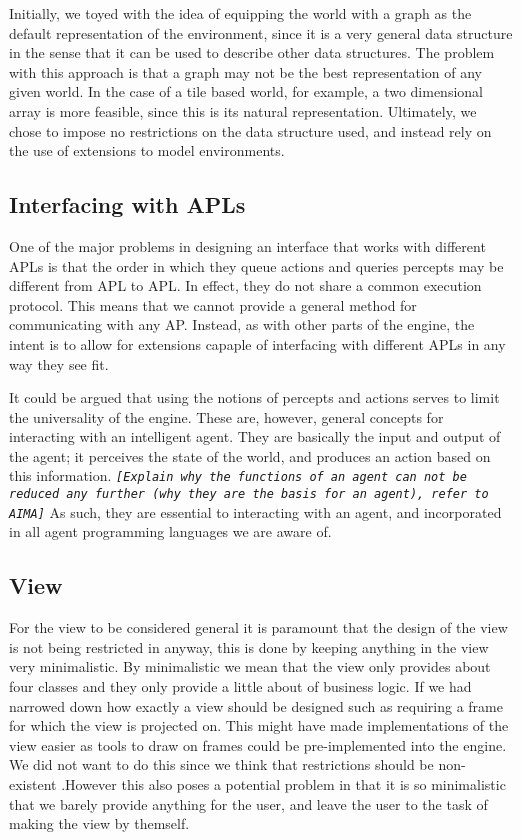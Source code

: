 Initially, we toyed with the idea of equipping the world with a graph
as the default representation of the environment, since it is a very
general data structure in the sense that it can be used to describe
other data structures. The problem with this approach is that a graph
may not be the best representation of any given world. In the case
of a tile based world, for example, a two dimensional array is more
feasible, since this is its natural representation. Ultimately, we
chose to impose no restrictions on the data structure used, and instead
rely on the use of extensions to model environments.


\subsection*{Interfacing with APLs}

One of the major problems in designing an interface that works with
different APLs is that the order in which they queue actions and queries
percepts may be different from APL to APL. In effect, they do not
share a common execution protocol. This means that we cannot provide
a general method for communicating with any AP. Instead, as with other
parts of the engine, the intent is to allow for extensions capaple
of interfacing with different APLs in any way they see fit.

It could be argued that using the notions of percepts and actions
serves to limit the universality of the engine. These are, however,
general concepts for interacting with an intelligent agent. They are
basically the input and output of the agent; it perceives the state
of the world, and produces an action based on this information. \texttt{\emph{{[}Explain
why the functions of an agent can not be reduced any further (why
they are the basis for an agent), refer to AIMA{]}}} As such, they
are essential to interacting with an agent, and incorporated in all
agent programming languages we are aware of.


\subsection*{View}

For the view to be considered general it is paramount that the design
of the view is not being restricted in anyway, this is done by keeping
anything in the view very minimalistic. By minimalistic we mean that
the view only provides about four classes and they only provide a
little about of business logic. If we had narrowed down how exactly
a view should be designed such as requiring a frame for which the
view is projected on. This might have made implementations of the
view easier as tools to draw on frames could be pre-implemented into
the engine. We did not want to do this since we think that restrictions
should be non-existent .However this also poses a potential problem
in that it is so minimalistic that we barely provide anything for
the user, and leave the user to the task of making the view by themself.


